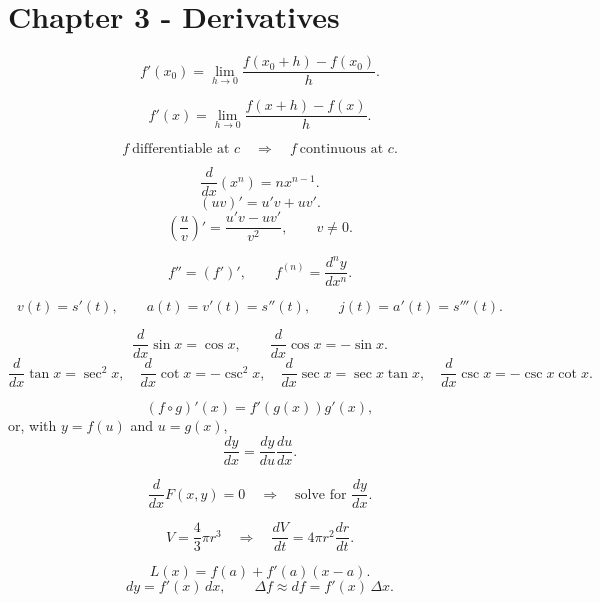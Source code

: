 
\section*{Chapter 3 - Derivatives}

\[
  f'(x_0)=\lim_{h\to0}\frac{f(x_0+h)-f(x_0)}{h}.
\]

\[
  f'(x)=\lim_{h\to0}\frac{f(x+h)-f(x)}{h}.
\]

\[
  f\ \text{differentiable at }c
  \quad\Longrightarrow\quad
  f\ \text{continuous at }c.
\]

\[
  \frac{d}{dx}(x^n)=nx^{n-1}.
\]
\[
  (uv)'=u'v+uv'.
\]
\[
  \left(\frac{u}{v}\right)'=\frac{u'v-uv'}{v^2},
  \qquad v\ne0.
\]

\[
  f''=(f')',\qquad
  f^{(n)}=\frac{d^ny}{dx^n}.
\]

\[
  v(t)=s'(t),\qquad
  a(t)=v'(t)=s''(t),\qquad
  j(t)=a'(t)=s'''(t).
\]

\[
  \frac{d}{dx}\sin x=\cos x,
  \qquad
  \frac{d}{dx}\cos x=-\sin x.
\]
\[
  \frac{d}{dx}\tan x=\sec^2x,
  \quad
  \frac{d}{dx}\cot x=-\csc^2x,
  \quad
  \frac{d}{dx}\sec x=\sec x\tan x,
  \quad
  \frac{d}{dx}\csc x=-\csc x\cot x.
\]

\[
  (f\circ g)'(x)=f'(g(x))g'(x),
\]
or, with \(y=f(u)\) and \(u=g(x)\),
\[
  \frac{dy}{dx}=\frac{dy}{du}\frac{du}{dx}.
\]

\[
  \frac{d}{dx}F(x,y)=0
  \quad\Longrightarrow\quad
  \text{solve for }\frac{dy}{dx}.
\]

\[
  V=\frac43\pi r^3
  \quad\Longrightarrow\quad
  \frac{dV}{dt}=4\pi r^2\frac{dr}{dt}.
\]

\[
  L(x)=f(a)+f'(a)(x-a).
\]
\[
  dy=f'(x)\,dx,
  \qquad
  \Delta f\approx df=f'(x)\,\Delta x.
\]

